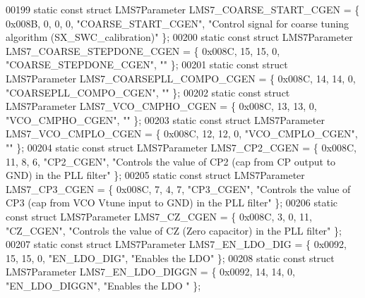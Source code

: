 \begin{DoxyCode}
00199 \textcolor{keyword}{static} \textcolor{keyword}{const} \textcolor{keyword}{struct }LMS7Parameter LMS7_COARSE_START_CGEN = \{ 0x008B, 0, 0, 0, \textcolor{stringliteral}{"COARSE\_START\_CGEN"}, \textcolor{stringliteral}{"Control
       signal for coarse tuning algorithm (SX\_SWC\_calibration)"} \};
00200 \textcolor{keyword}{static} \textcolor{keyword}{const} \textcolor{keyword}{struct }LMS7Parameter LMS7_COARSE_STEPDONE_CGEN = \{ 0x008C, 15, 15, 0, \textcolor{stringliteral}{"COARSE\_STEPDONE\_CGEN"}, \textcolor{stringliteral}{
      ""} \};
00201 \textcolor{keyword}{static} \textcolor{keyword}{const} \textcolor{keyword}{struct }LMS7Parameter LMS7_COARSEPLL_COMPO_CGEN = \{ 0x008C, 14, 14, 0, \textcolor{stringliteral}{"COARSEPLL\_COMPO\_CGEN"}, \textcolor{stringliteral}{
      ""} \};
00202 \textcolor{keyword}{static} \textcolor{keyword}{const} \textcolor{keyword}{struct }LMS7Parameter LMS7_VCO_CMPHO_CGEN = \{ 0x008C, 13, 13, 0, \textcolor{stringliteral}{"VCO\_CMPHO\_CGEN"}, \textcolor{stringliteral}{""} \};
00203 \textcolor{keyword}{static} \textcolor{keyword}{const} \textcolor{keyword}{struct }LMS7Parameter LMS7_VCO_CMPLO_CGEN = \{ 0x008C, 12, 12, 0, \textcolor{stringliteral}{"VCO\_CMPLO\_CGEN"}, \textcolor{stringliteral}{""} \};
00204 \textcolor{keyword}{static} \textcolor{keyword}{const} \textcolor{keyword}{struct }LMS7Parameter LMS7_CP2_CGEN = \{ 0x008C, 11, 8, 6, \textcolor{stringliteral}{"CP2\_CGEN"}, \textcolor{stringliteral}{"Controls the value of
       CP2 (cap from CP output to GND) in the PLL filter"} \};
00205 \textcolor{keyword}{static} \textcolor{keyword}{const} \textcolor{keyword}{struct }LMS7Parameter LMS7_CP3_CGEN = \{ 0x008C, 7, 4, 7, \textcolor{stringliteral}{"CP3\_CGEN"}, \textcolor{stringliteral}{"Controls the value of CP3
       (cap from VCO Vtune input to GND) in the PLL filter"} \};
00206 \textcolor{keyword}{static} \textcolor{keyword}{const} \textcolor{keyword}{struct }LMS7Parameter LMS7_CZ_CGEN = \{ 0x008C, 3, 0, 11, \textcolor{stringliteral}{"CZ\_CGEN"}, \textcolor{stringliteral}{"Controls the value of CZ
       (Zero capacitor) in the PLL filter"} \};
00207 \textcolor{keyword}{static} \textcolor{keyword}{const} \textcolor{keyword}{struct }LMS7Parameter LMS7_EN_LDO_DIG = \{ 0x0092, 15, 15, 0, \textcolor{stringliteral}{"EN\_LDO\_DIG"}, \textcolor{stringliteral}{"Enables the LDO"} \};
00208 \textcolor{keyword}{static} \textcolor{keyword}{const} \textcolor{keyword}{struct }LMS7Parameter LMS7_EN_LDO_DIGGN = \{ 0x0092, 14, 14, 0, \textcolor{stringliteral}{"EN\_LDO\_DIGGN"}, \textcolor{stringliteral}{"Enables the LDO
      "} \};

\end{DoxyCode}
